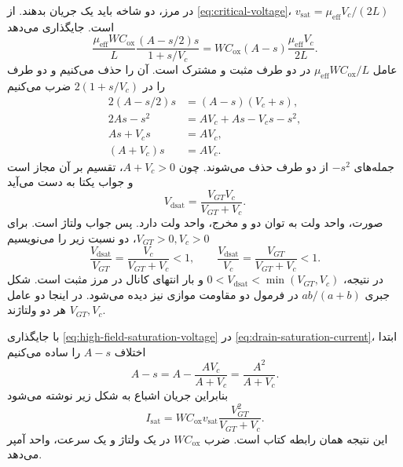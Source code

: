 در مرز، دو شاخه باید یک جریان بدهند. از \eqref{eq:critical-voltage}،
\(v_{\mathrm{sat}}=\mu_{\mathrm{eff}}V_c/(2L)\) است. جایگذاری می‌دهد
\begin{equation*}
 \frac{\mu_{\mathrm{eff}}WC_{\mathrm{ox}}}{L}
 \frac{(A-s/2)s}{1+s/V_c}
 =WC_{\mathrm{ox}}(A-s)\frac{\mu_{\mathrm{eff}}V_c}{2L}.
\end{equation*}
عامل \(\mu_{\mathrm{eff}}WC_{\mathrm{ox}}/L\) در دو طرف مثبت و مشترک است.
آن را حذف می‌کنیم و دو طرف را در \(2(1+s/V_c)\) ضرب می‌کنیم
\begin{align*}
 2(A-s/2)s&=(A-s)(V_c+s),\\
 2As-s^2&=AV_c+As-V_cs-s^2,\\
 As+V_cs&=AV_c,\\
 (A+V_c)s&=AV_c.
\end{align*}
جمله‌های \(-s^2\) از دو طرف حذف می‌شوند. چون \(A+V_c>0\)، تقسیم بر آن
مجاز است و جواب یکتا به دست می‌آید
\begin{equation}
 \boxed{V_{\mathrm{dsat}}=\frac{V_{GT}V_c}{V_{GT}+V_c}}.
 \label{eq:high-field-saturation-voltage}
\end{equation}
صورت، واحد ولت به توان دو و مخرج، واحد ولت دارد. پس جواب ولتاژ است.
برای \(V_{GT}>0,V_c>0\)، دو نسبت زیر را می‌نویسیم
\begin{equation*}
 \frac{V_{\mathrm{dsat}}}{V_{GT}}=\frac{V_c}{V_{GT}+V_c}<1,\qquad
 \frac{V_{\mathrm{dsat}}}{V_c}=\frac{V_{GT}}{V_{GT}+V_c}<1.
\end{equation*}
در نتیجه، \(0<V_{\mathrm{dsat}}<\min(V_{GT},V_c)\) و بار انتهای کانال
در مرز مثبت است. شکل جبری \(ab/(a+b)\) در فرمول دو مقاومت موازی نیز
دیده می‌شود. در اینجا دو عامل \(V_{GT},V_c\) هر دو ولتاژند.

با جایگذاری \eqref{eq:high-field-saturation-voltage} در
\eqref{eq:drain-saturation-current}، ابتدا اختلاف \(A-s\) را ساده می‌کنیم
\[
 A-s=A-\frac{AV_c}{A+V_c}=\frac{A^2}{A+V_c}.
\]
بنابراین جریان اشباع به شکل زیر نوشته می‌شود
\begin{equation}
 \boxed{I_{\mathrm{sat}}
 =WC_{\mathrm{ox}}v_{\mathrm{sat}}\frac{V_{GT}^2}{V_{GT}+V_c}}.
 \label{eq:high-field-saturation-current}
\end{equation}
این نتیجه همان رابطه  کتاب است. ضرب
\(WC_{\mathrm{ox}}\) در یک ولتاژ و یک سرعت، واحد آمپر می‌دهد.

